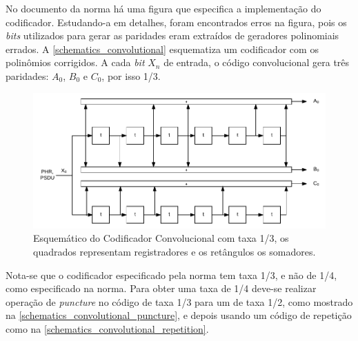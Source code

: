 	No documento da norma há uma figura que especifica a implementação do codificador. Estudando-a em detalhes, foram encontrados erros na figura, pois os \textit{bits} utilizados para gerar as paridades eram extraídos de geradores polinomiais errados. A \autoref{schematics_convolutional} esquematiza um codificador com os polinômios corrigidos. A cada \textit{bit} $X_{n}$ de entrada, o código convolucional gera três paridades: $A_{0}$, $B_{0}$ e $C_{0}$, por isso 1/3.
	\begin{figure}[htb]
		\caption{\label{schematics_convolutional} Esquemático do Codificador Convolucional com taxa 1/3, os quadrados representam registradores e os retângulos os somadores.}
		\centering
		\includegraphics[width=0.6\textheight]{schematics/convolutional.pdf}
	\end{figure}
	Nota-se que o codificador especificado pela norma tem taxa 1/3, e não de 1/4, como especificado na norma. Para obter uma taxa de 1/4 deve-se realizar operação de \textit{puncture} no código de taxa 1/3 para um de taxa 1/2, como mostrado na \autoref{schematics_convolutional_puncture}, e depois usando um código de repetição como na \autoref{schematics_convolutional_repetition}.
	

